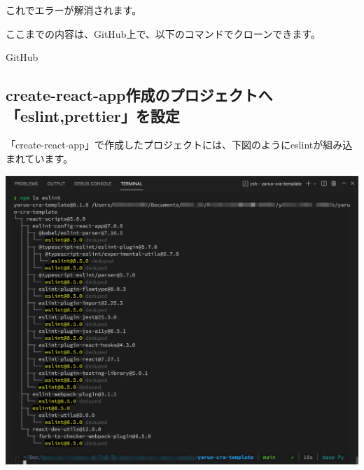 これでエラーが解消されます。

\begin{starternote}[]{}

ここまでの内容は、GitHub上で、以下のコマンドでクローンできます。

\def\startercodeblockfontsize{}
\begin{starterterminal}[]{GitHub}\end{starterterminal}
\end{starternote}

\subsection{create{-}react{-}app作成のプロジェクトへ「eslint,prettier」を設定}
\keeplastskip{
  \label{sec:2-3-2}
  \label{sec04-cra-with-eslint}
  \par\nobreak
}

「create{-}react{-}app」で作成したプロジェクトには、下図のようにeslintが組み込まれています。

\begin{reviewimage}%
\includegraphics[width=0.8\maxwidth]{./images/02-create-react-app/cra-eslint01.png}%
\label{image:02-create-react-app:cra-eslint01}
\end{reviewimage}

\clearpage



